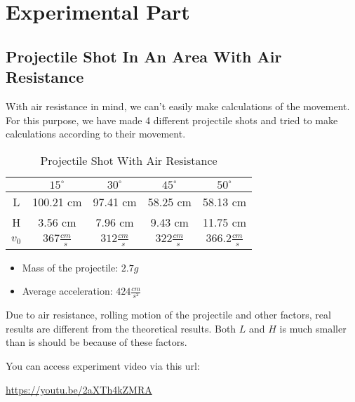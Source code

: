 \chapter{Experimental Part}

\section{Projectile Shot In An Area With Air Resistance}
With air resistance in mind, we can’t easily make calculations of the movement. For this purpose, we have made 4 different projectile shots and tried to make calculations according to their movement.

\begin{table}[h]
	\centering
	\begin{tabular}{|c|c|c|c|c|}
		\hline
		      & $15^{\circ}$       & $30^{\circ}$       & $45^{\circ}$       & $50^{\circ}$         \\ \hline
		L     & 100.21 cm          & 97.41 cm           & 58.25 cm           & 58.13 cm             \\ \hline
		H     & 3.56 cm            & 7.96 cm            & 9.43 cm            & 11.75 cm             \\ \hline
		$v_0$ & $367 \frac{cm}{s}$ & $312 \frac{cm}{s}$ & $322 \frac{cm}{s}$ & $366.2 \frac{cm}{s}$ \\ \hline
	\end{tabular}
	\caption{Projectile Shot With Air Resistance}
\end{table}

\begin{itemize}
	\item Mass of the projectile: $2.7g$
	\item Average acceleration: $424 \frac{cm}{s^2}$
\end{itemize}

\noindent Due to air resistance, rolling motion of the projectile and other factors, real results are different from the theoretical results. Both $L$ and $H$ is much smaller than is should be because of these factors.

You can access experiment video via this url:

\url{https://youtu.be/2aXTh4kZMRA}
